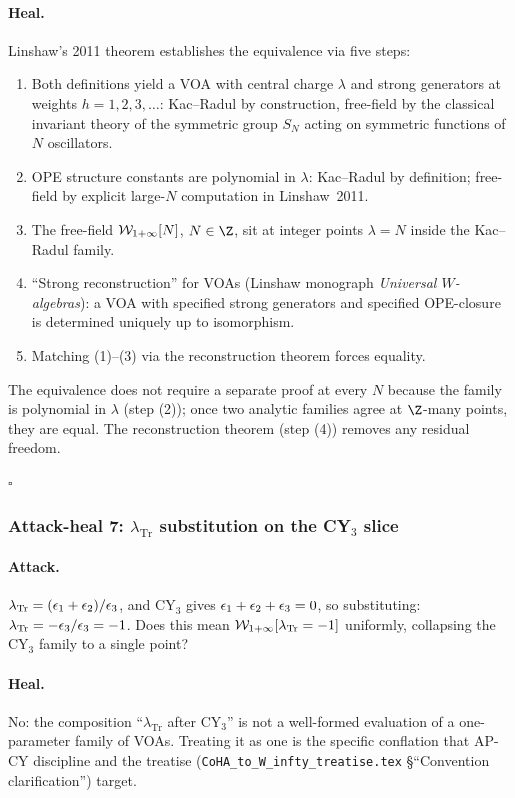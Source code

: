\paragraph{Heal.}
Linshaw's 2011 theorem establishes the equivalence via five steps:
\begin{enumerate}
\item Both definitions yield a VOA with central charge $\lambda$ and strong
generators at weights $h = 1, 2, 3, \ldots$: Kac--Radul by construction,
free-field by the classical invariant theory of the symmetric group $S_N$
acting on symmetric functions of $N$ oscillators.
\item OPE structure constants are polynomial in $\lambda$: Kac--Radul by
definition; free-field by explicit large-$N$ computation in
Linshaw~2011.
\item The free-field $\mathcal{W}_{1+\infty}[N]$, $N \in \Z$, sit at integer points
$\lambda = N$ inside the Kac--Radul family.
\item ``Strong reconstruction'' for VOAs (Linshaw monograph \emph{Universal
$W$-algebras}): a VOA with specified strong generators and specified
OPE-closure is determined uniquely up to isomorphism.
\item Matching (1)--(3) via the reconstruction theorem forces equality.
\end{enumerate}
The equivalence does not require a separate proof at every $N$ because the
family is polynomial in $\lambda$ (step (2)); once two analytic families agree
at $\Z$-many points, they are equal. The reconstruction theorem (step (4))
removes any residual freedom.

\hfill$\square$

\subsubsection{Attack-heal 7: $\lambda_{\mathrm{Tr}}$ substitution on the CY$_3$ slice}
\label{w17:subsubsec:ah7-lambda-tr}

\paragraph{Attack.}
$\lambda_{\mathrm{Tr}} = (\epsilon_1 + \epsilon_2)/\epsilon_3$, and CY$_3$ gives
$\epsilon_1 + \epsilon_2 + \epsilon_3 = 0$, so substituting: $\lambda_{\mathrm{Tr}} =
-\epsilon_3/\epsilon_3 = -1$. Does this mean $\mathcal{W}_{1+\infty}[\lambda_{\mathrm{Tr}} = -1]$
uniformly, collapsing the CY$_3$ family to a single point?

\paragraph{Heal.}
No: the composition ``$\lambda_{\mathrm{Tr}}$ after CY$_3$'' is not a well-formed
evaluation of a one-parameter family of VOAs. Treating it as one is the
specific conflation that AP-CY discipline and the treatise
(\texttt{CoHA\_to\_W\_infty\_treatise.tex} \S``Convention clarification'')
target.

